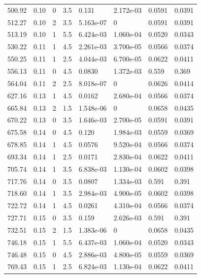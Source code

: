 \documentclass[preview]{standalone}
\begin{document}
{{{\begin{tabular}{L{1.2cm}C{1.2cm} C{0.3cm}C{0.5cm} C{1.4cm}C{1.4cm} C{1.4cm}C{1.4cm}}
  500.92  &  0.10  & 0     & 3.5 &  0.131  & 2.172e-03  & 0.0591 &  0.0391   \\ 
  512.27  &  0.10  & 2     & 3.5 &  5.163e-07  & 0  & 0.0591 &  0.0391   \\ 
  513.19  &  0.10  & 1     & 5.5 &  6.424e-03  & 1.060e-04  & 0.0520 &  0.0343   \\ 
  530.22  &  0.11  & 1     & 4.5 &  2.261e-03  & 3.700e-05  & 0.0566 &  0.0374   \\ 
  550.25  &  0.11  & 1     & 2.5 &  4.044e-03  & 6.700e-05  & 0.0622 &  0.0411   \\ 
  556.13  &  0.11  & 0     & 4.5 &  0.0830  & 1.372e-03  & 0.559 &  0.369   \\ 
  564.04  &  0.11  & 2     & 2.5 &  8.018e-07  & 0  & 0.0626 &  0.0414   \\ 
  627.16  &  0.13  & 1     & 4.5 &  0.0162  & 2.680e-04  & 0.0566 &  0.0374   \\ 
  665.84  &  0.13  & 2     & 1.5 &  1.548e-06  & 0  & 0.0658 &  0.0435   \\ 
  670.22  &  0.13  & 0     & 3.5 &  1.646e-03  & 2.700e-05  & 0.0591 &  0.0391   \\ 
  675.58  &  0.14  & 0     & 4.5 &  0.120  & 1.984e-03  & 0.0559 &  0.0369   \\ 
  678.85  &  0.14  & 1     & 4.5 &  0.0576  & 9.520e-04  & 0.0566 &  0.0374   \\ 
  693.34  &  0.14  & 1     & 2.5 &  0.0171  & 2.830e-04  & 0.0622 &  0.0411   \\ 
  705.74  &  0.14  & 1     & 3.5 &  6.838e-03  & 1.130e-04  & 0.0602 &  0.0398   \\ 
  717.76  &  0.14  & 0     & 3.5 &  0.0807  & 1.334e-03  & 0.591 &  0.391   \\ 
  718.60  &  0.14  & 1     & 3.5 &  2.984e-03  & 4.900e-05  & 0.0602 &  0.0398   \\ 
  722.72  &  0.14  & 1     & 4.5 &  0.0261  & 4.310e-04  & 0.0566 &  0.0374   \\ 
  727.71  &  0.15  & 0     & 3.5 &  0.159  & 2.626e-03  & 0.591 &  0.391   \\ 
  732.51  &  0.15  & 2     & 1.5 &  1.383e-06  & 0  & 0.0658 &  0.0435   \\ 
  746.18  &  0.15  & 1     & 5.5 &  6.437e-03  & 1.060e-04  & 0.0520 &  0.0343   \\ 
  746.48  &  0.15  & 0     & 4.5 &  2.886e-03  & 4.800e-05  & 0.0559 &  0.0369   \\ 
  769.43  &  0.15  & 1     & 2.5 &  6.824e-03  & 1.130e-04  & 0.0622 &  0.0411   \\ 

\end{tabular}}}}
\end{document}
